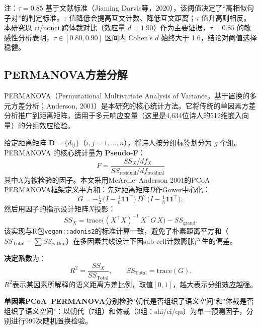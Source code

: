 \documentclass[12pt,a4paper]{article}
\numberwithin{equation}{section}
\begin{document}
注：$\tau=0.85$ 基于文献标准（Jiaming Darvis等，2020），该阈值决定了“高相似句子对”的判定标准。$\tau$ 值降低会提高互文计数、降低互文距离；$\tau$ 值升高则相反。本研究以 ci/nonci 跨体裁对比（效应量 $d=1.90$）作为主要证据，$\tau=0.85$ 的敏感性分析表明，$\tau\in[0.80,0.90]$ 区间内 Cohen's $d$ 始终大于 1.6，结论对阈值选择稳健。

\subsection{PERMANOVA方差分解}

PERMANOVA（Permutational Multivariate Analysis of Variance，基于置换的多元方差分析；Anderson, 2001）是本研究的核心统计方法。它将传统的单因素方差分析推广到距离矩阵，适用于多元响应变量（这里是4,634位诗人的512维嵌入向量）的分组效应检验。

给定距离矩阵 $\mathbf{D}=\{d_{ij}\}$（$i,j=1,\ldots,n$），将诗人按分组标签划分为 $g$ 个组。PERMANOVA 的核心统计量为 \textbf{Pseudo-F}：
\begin{equation}
F = \frac{SS_{X}/df_{X}}{SS_{\text{residual}}/df_{\text{residual}}}
\end{equation}
其中$X$为被检验的因子。本文采用McArdle--Anderson 2001的PCoA--PERMANOVA框架定义平方和：先对距离矩阵$D$作Gower中心化：
\begin{equation}
G = -\tfrac{1}{2}\,\bigl(I-\tfrac{1}{n}\mathbf{1}\mathbf{1}^{\top}\bigr)\, D^{2}\, \bigl(I-\tfrac{1}{n}\mathbf{1}\mathbf{1}^{\top}\bigr),
\end{equation}
然后用因子的指示设计矩阵$X$投影：
\begin{equation}
SS_{X} = \mathrm{trace}\!\bigl((X^{\top} X)^{-1}\, X^{\top} G\, X\bigr) - SS_{\text{grand}}.
\end{equation}
该实现与R包\texttt{vegan::adonis2}的标准计算一致，避免了朴素距离平方和（$SS_{\text{Total}} - \sum SS_{\text{within}}$）在多因素共线设计下因sub-cell计数膨胀产生的偏差。

\textbf{决定系数}为：
\begin{equation}
R^{2} = \frac{SS_{X}}{SS_{\text{Total}}},\qquad SS_{\text{Total}} = \mathrm{trace}(G).
\end{equation}
$R^{2}$表示某因素所解释的语义距离方差比例，取值$[0,1]$，越大表示分组效应越强。

\textbf{单因素PCoA--PERMANOVA}分别检验"朝代是否组织了语义空间"和"体裁是否组织了语义空间"：以朝代（7组）和体裁（3组：shi/ci/qu）为单一预测因子，分别进行999次随机置换检验。
\end{document}
